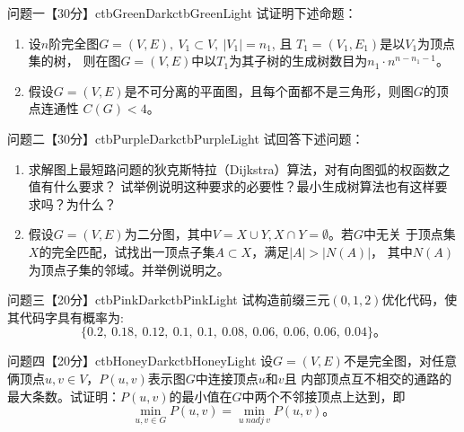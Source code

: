 \documentclass[12pt]{simple_doc}
\begin{document}

    \begin{cbstripe}{问题一【30分】}{ctbGreenDark}{ctbGreenLight}
        试证明下述命题：
        \begin{enumerate}
            \item 设$n$阶完全图$G=(V, E),\ V_1 \subset V,\ \big | V_1 \big | = n_1$, 且
                $T_1=(V_1, E_1)$是以$V_1$为顶点集的树，
                则在图$G=(V, E)$中以$T_1$为其子树的生成树数目为$n_1\cdot n^{n-n_1 -1}$。
            \item 假设$G=(V, E)$是不可分离的平面图，且每个面都不是三角形，则图$G$的顶点连通性
                $C(G) < 4$。
        \end{enumerate}
    \end{cbstripe}

    \begin{cbstripe}{问题二【30分】}{ctbPurpleDark}{ctbPurpleLight}
        试回答下述问题：
        \begin{enumerate}
            \item 求解图上最短路问题的狄克斯特拉（Dijkstra）算法，对有向图弧的权函数之值有什么要求？
                试举例说明这种要求的必要性？最小生成树算法也有这样要求吗？为什么？
            \item 假设$G=(V, E)$为二分图，其中$V=X \cup Y, X \cap Y = \emptyset$。若$G$中无关
                于顶点集$X$的完全匹配，试找出一顶点子集$A \subset X$，满足$|A| > \big |N(A)\big |$，
                其中$N(A)$为顶点子集的邻域。并举例说明之。
        \end{enumerate}
    \end{cbstripe}

    \begin{cbstripe}{问题三【20分】}{ctbPinkDark}{ctbPinkLight}
        试构造前缀三元$(0, 1, 2)$优化代码，使其代码字具有概率为:
        \begin{equation*}
            \{0.2,\ 0.18,\ 0.12,\ 0.1,\ 0.1,\ 0.08,\ 0.06,\ 0.06,\ 0.06,\ 0.04\}。
        \end{equation*}
    \end{cbstripe}

    \begin{cbstripe}{问题四【20分】}{ctbHoneyDark}{ctbHoneyLight}
        设$G=(V, E)$不是完全图，对任意俩顶点$u, v \in V$，$P(u, v)$表示图$G$中连接顶点$u$和$v$且
        内部顶点互不相交的通路的最大条数。试证明：$P(u, v)$的最小值在$G$中两个不邻接顶点上达到，即
        \begin{equation*}
            \min_{u, v \in G} P(u, v) = \min_{u\ \textit{nadj}\ v} P(u, v)。
        \end{equation*}

    \end{cbstripe}
\end{document}
